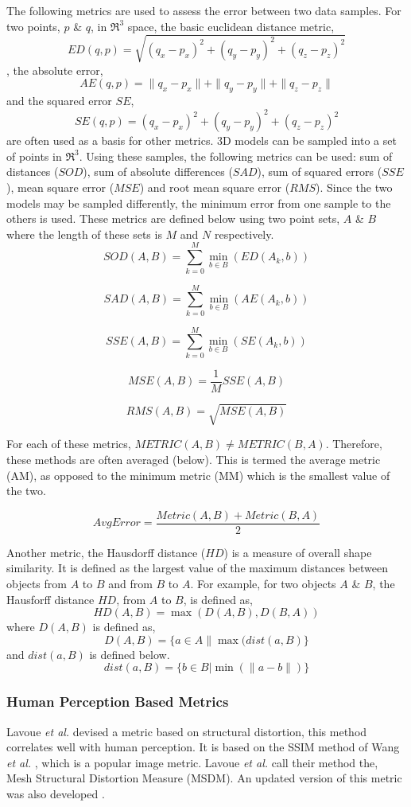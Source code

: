 The following metrics are used to assess the error between two data samples. For two points, $p$ \& $q$, in $\Re^3$ space, the basic euclidean distance metric,
$$
ED(q,p) = \sqrt{(q_x - p_x)^2 + (q_y - p_y)^2 + (q_z - p_z)^2}
$$,
the absolute error,
$$
AE(q,p) = \|q_x - p_x\| + \|q_y - p_y\| + \|q_z - p_z\|
$$
and the squared error $SE$, 
$$
SE(q,p) = (q_x - p_x)^2 + (q_y - p_y)^2 + (q_z - p_z)^2
$$
are often used as a basis for other metrics. 3D models can be sampled into a set of points in $\Re^3$. Using these samples, the following metrics can be used: sum of distances ($SOD$), sum of absolute differences ($SAD$), sum of squared errors ($SSE$), mean square error ($MSE$) and root mean square error ($RMS$). Since the two models may be sampled differently, the minimum error from one sample to the others is used. These metrics are defined below using two point sets, $A$ \& $B$ where the length of these sets is $M$ and $N$ respectively.
$$
SOD(A,B) = \sum_{k=0}^{M} \min_{b \in B}(ED(A_k,b))
$$

$$
SAD(A,B) = \sum_{k=0}^{M} \min_{b \in B}(AE(A_k,b))
$$

$$
SSE(A,B) = \sum_{k=0}^{M} \min_{b \in B}(SE(A_k,b))
$$

$$
MSE(A,B) = \frac{1}{M}SSE(A,B)
$$

$$
RMS(A,B) = \sqrt{MSE(A,B)}
$$

For each of these metrics, $METRIC(A,B) \neq METRIC(B,A)$. Therefore, these methods are often averaged (below). This is termed the average metric (AM), as opposed to the minimum metric (MM) which is the smallest value of the two.

$$
AvgError = \frac{Metric(A,B)+Metric(B,A)}{2}
$$

Another metric, the Hausdorff distance ($HD$) is a measure of overall shape similarity. It is defined as the largest value of the maximum distances between objects from $A$ to $B$ and from $B$ to $A$. For example, for two objects $A$ \& $B$, the Hausforff distance $HD$, from $A$ to $B$, is defined as,
$$
HD(A,B) = \max(D(A,B),D(B,A))
$$
where $D(A,B)$ is defined as,
$$
D(A,B) = \{a \in A \| \max(dist(a,B)\}
$$
and $dist(a,B)$ is defined below.
$$
dist(a,B) = \{b \in B \left| \min(\|a-b\|)\right.\}
$$

\subsubsection{Human Perception Based Metrics}

Lavoue \textit{et al.} \cite{Lavoue06Perceptually} devised a metric based on structural distortion, this method correlates well with human perception. It is based on the SSIM method of Wang \textit{et al.} \cite{Wang04Image}, which is a popular image metric. Lavoue \textit{et al.} call their method the, Mesh Structural Distortion Measure (MSDM). An updated version of this metric was also developed \cite{Lavoue11Multiscale}.

